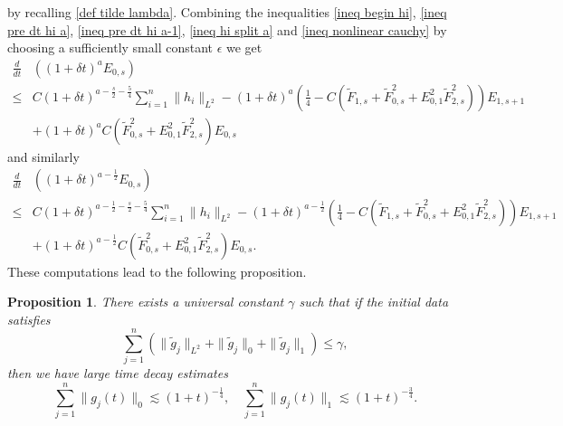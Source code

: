\documentclass[11pt]{article}
\newcommand{\TF}{\tilde{F}}
\newtheorem{proposition}{Proposition}[section]
\theoremstyle{definition}
\numberwithin{equation}{section}
\begin{document}
by recalling \eqref{def tilde lambda}.
Combining the inequalities \eqref{ineq begin hi}, \eqref{ineq pre dt hi a}, \eqref{ineq pre dt hi a-1}, \eqref{ineq hi split a} and \eqref{ineq nonlinear cauchy} by choosing a sufficiently small constant $\epsilon$ we get
\begin{equation}\label{ineq dt hi a}
    \begin{aligned}
    \frac{d}{dt}&\left((1+\delta t)^aE_{0,s}\right)\\
    \leq &C(1+\delta t)^{a-\frac{s}{2}-\frac{5}{4}}\sum_{i=1}^n\|h_i\|_{L^2}-(1+\delta t)^a\left(\frac{1}{4}-C\left(\TF_{1,s}+\TF_{0,s}^2+E_{0,1}^2\TF_{2,s}^2\right)\right)E_{1,s+1}\\
    &+(1+\delta t)^aC\left(\TF_{0,s}^2+E_{0,1}^2\TF_{2,s}^2\right)E_{0,s}
\end{aligned}
\end{equation}
and similarly
\begin{equation}\label{ineq dt hi a-1}
    \begin{aligned}
    \frac{d}{dt}&\left((1+\delta t)^{a-\frac{1}{2}}E_{0,s}\right)\\
    \leq &C(1+\delta t)^{a-\frac{1}{2}-\frac{s}{2}-\frac{5}{4}}\sum_{i=1}^n\|h_i\|_{L^2}-(1+\delta t)^{a-\frac{1}{2}}\left(\frac{1}{4}-C\left(\TF_{1,s}+\TF_{0,s}^2+E_{0,1}^2\TF_{2,s}^2\right)\right)E_{1,s+1}\\
    &+(1+\delta t)^{a-\frac{1}{2}}C\left(\TF_{0,s}^2+E_{0,1}^2\TF_{2,s}^2\right)E_{0,s}.
\end{aligned}
\end{equation}
These computations lead to the following proposition.
\begin{proposition}\label{prop decay s01}
    There exists a universal constant $\gamma$ such that if the initial data satisfies 
\begin{equation}
    \sum_{j=1}^{n}\left(\|\tilde{g}_j\|_{L^2}+\|\tilde{g}_j\|_0+\|\tilde{g}_j\|_1\right)\leq\gamma,
\end{equation}
then we have large time decay estimates
\begin{equation}
    \sum_{j=1}^n\|g_j(t)\|_0\lesssim(1+t)^{-\frac{1}{4}},\quad \sum_{j=1}^n\|g_j(t)\|_1\lesssim(1+t)^{-\frac{3}{4}}.
\end{equation}
\end{proposition}
\end{document}
